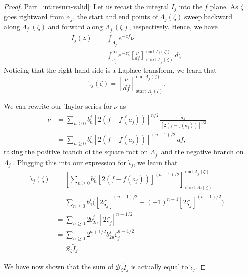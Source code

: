 \documentclass{article}
\theoremstyle{definition}
\newcommand{\borel}{\mathcal{B}}
\theoremstyle{plain}
\begin{document}
\begin{proof}
Part~\eqref{int:resum-valid}: Let us recast the integral $I_j$ into the $f$ plane. As $\zeta$ goes rightward from $\alpha_j$, the start and end points of $\Lambda_j(\zeta)$ sweep backward along $\Lambda^-_j(\zeta)$ and forward along $\Lambda^+_j(\zeta)$, respectively. Hence, we have
\begin{align*}
I_j(z) & = \int_{\Lambda_j} e^{-zf} \nu \\
& = \int_{\alpha_j}^\infty e^{-z\zeta} \left[\frac{\nu}{df}\right]_{\operatorname{start} \Lambda_j(\zeta)}^{\operatorname{end} \Lambda_j(\zeta)}\,d\zeta.
\end{align*}
Noticing that the right-hand side is a Laplace transform, we learn that
\begin{equation}\label{thimble-difference}
\hat{\iota}_j(\zeta) = \left[\frac{\nu}{df}\right]_{\operatorname{start} \Lambda_j(\zeta)}^{\operatorname{end} \Lambda_j(\zeta)}.
\end{equation}

We can rewrite our Taylor series for $\nu$ as
\begin{align*}
\nu & = \sum_{n \ge 0} b_n^j [2(f - f(a_j))]^{n/2}\,\frac{df}{[2(f - f(a_j))]^{1/2}} \\
& = \sum_{n \ge 0} b_n^j [2(f - f(a_j))]^{(n - 1)/2}\,df,
\end{align*}
taking the positive branch of the square root on $\Lambda^+_j$ and the negative branch on $\Lambda^-_j$. Plugging this into our expression for $\hat{\iota}_j$, we learn that
\begin{align*}
\hat{\iota}_j(\zeta) & = \left[ \sum_{n \ge 0} b_n^j [2(f - f(a_j))]^{(n - 1)/2} \right]_{\operatorname{start} \Lambda_j(\zeta)}^{\operatorname{end} \Lambda_j(\zeta)} \\
& = \sum_{n \ge 0} b_n^j \Big( [2\zeta_j]^{(n - 1)/2} - (-1)^{n-1}[2\zeta_j]^{(n - 1)/2} \Big) \\
& = \sum_{n \ge 0} 2 b_{2n}^j [2\zeta_j]^{n - 1/2} \\
& = \sum_{n \ge 0} 2^{n+1/2} b_{2n}^j \zeta_j^{n - 1/2} \\
& = \borel_{\zeta} \tilde{I}_j.
\end{align*}

We have now shown that the sum of $\borel_{\zeta} \tilde{I}_j$ is actually equal to $\hat{\iota}_j$.


\end{proof}
\end{document}
